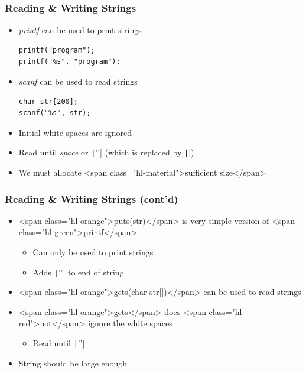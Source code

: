 \documentclass{../c-lecture}
\begin{document}
\begin{frame}[fragile]
  \frametitle{Reading \& Writing Strings}
  \begin{itemize}
    \item \textit{\color{SpringGreen} printf} can be used to print strings
    \begin{verbatim}
printf("program");
printf("%s", "program");
    \end{verbatim}
  \end{itemize}
  \begin{itemize}
    \item \textit{\color{LimeGreen} scanf} can be used to read strings
    \begin{verbatim}
char str[200];
scanf("%s", str);
    \end{verbatim}
    \item Initial white spaces are ignored
    \item
      Read until \textit{\color{Orange} space} or
      \texttt|'\n'| (which is replaced by \texttt|\0|)

    \item We must allocate <span class="hl-material">sufficient size</span>
  \end{itemize}
\end{frame}

\begin{frame}
  \frametitle{Reading \& Writing Strings (cont’d)}
  \begin{itemize}
    \item
      <span class="hl-orange">puts(str)</span> is very simple version of
      <span class="hl-green">printf</span>

    \begin{itemize}
      \item Can only be used to print strings
      \item Adds \texttt|'\n'| to end of string
    \end{itemize}
    \item
      <span class="hl-orange">gets(char str[])</span> can be used to read
      strings

    \item
      <span class="hl-orange">gets</span> does
      <span class="hl-red">not</span> ignore the white spaces

    \begin{itemize}
      \item Read until \texttt|'\n'|
    \end{itemize}
    \item String should be large enough
  \end{itemize}
\end{frame}
\end{document}
